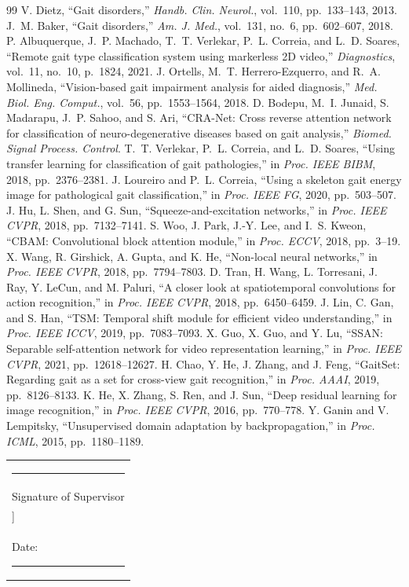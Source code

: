 \documentclass[conference]{IEEEtran}
\begin{document}
\begin{thebibliography}{99}
 V. Dietz, ``Gait disorders,'' \emph{Handb. Clin. Neurol.},
vol.~110, pp.~133--143, 2013.
 J.~M. Baker, ``Gait disorders,'' \emph{Am. J. Med.},
vol.~131, no.~6, pp.~602--607, 2018.
 P. Albuquerque, J.~P. Machado, T.~T. Verlekar,
P.~L. Correia, and L.~D. Soares, ``Remote gait type classification system using
markerless 2D video,'' \emph{Diagnostics}, vol.~11, no.~10, p.~1824, 2021.
 J. Ortells, M.~T. Herrero-Ezquerro, and R.~A. Mollineda,
``Vision-based gait impairment analysis for aided diagnosis,'' \emph{Med. Biol.
Eng. Comput.}, vol.~56, pp.~1553--1564, 2018.
 D. Bodepu, M.~I. Junaid, S. Madarapu, J.~P. Sahoo, and
S. Ari, ``CRA-Net: Cross reverse attention network for classification of
neuro-degenerative diseases based on gait analysis,'' \emph{Biomed. Signal
Process. Control}.
 T.~T. Verlekar, P.~L. Correia, and L.~D. Soares,
``Using transfer learning for classification of gait pathologies,'' in
\emph{Proc. IEEE BIBM}, 2018, pp.~2376--2381.
 J. Loureiro and P.~L. Correia, ``Using a skeleton gait
energy image for pathological gait classification,'' in \emph{Proc. IEEE FG},
2020, pp.~503--507.
 J. Hu, L. Shen, and G. Sun, ``Squeeze-and-excitation
networks,'' in \emph{Proc. IEEE CVPR}, 2018, pp.~7132--7141.
 S. Woo, J. Park, J.-Y. Lee, and I.~S. Kweon, ``CBAM:
Convolutional block attention module,'' in \emph{Proc. ECCV}, 2018, pp.~3--19.
 X. Wang, R. Girshick, A. Gupta, and K. He,
``Non-local neural networks,'' in \emph{Proc. IEEE CVPR}, 2018, pp.~7794--7803.
 D. Tran, H. Wang, L. Torresani, J. Ray, Y. LeCun, and
M. Paluri, ``A closer look at spatiotemporal convolutions for action
recognition,'' in \emph{Proc. IEEE CVPR}, 2018, pp.~6450--6459.
 J. Lin, C. Gan, and S. Han, ``TSM: Temporal shift module
for efficient video understanding,'' in \emph{Proc. IEEE ICCV}, 2019,
pp.~7083--7093.
 X. Guo, X. Guo, and Y. Lu, ``SSAN: Separable
self-attention network for video representation learning,'' in \emph{Proc. IEEE
CVPR}, 2021, pp.~12618--12627.
 H. Chao, Y. He, J. Zhang, and J. Feng, ``GaitSet:
Regarding gait as a set for cross-view gait recognition,'' in \emph{Proc.
AAAI}, 2019, pp.~8126--8133.
 K. He, X. Zhang, S. Ren, and J. Sun, ``Deep residual
learning for image recognition,'' in \emph{Proc. IEEE CVPR}, 2016, pp.~770--778.
 Y. Ganin and V. Lempitsky, ``Unsupervised domain adaptation
by backpropagation,'' in \emph{Proc. ICML}, 2015, pp.~1180--1189.
\end{thebibliography}

\vspace{6mm}
\noindent\begin{tabular}{@{}l@{}}
\rule{4.5cm}{0.4pt}\\
Signature of Supervisor\\
[[Supervisor Name]]\\
Date: \rule{2.5cm}{0.4pt}
\end{tabular}
\end{document}
